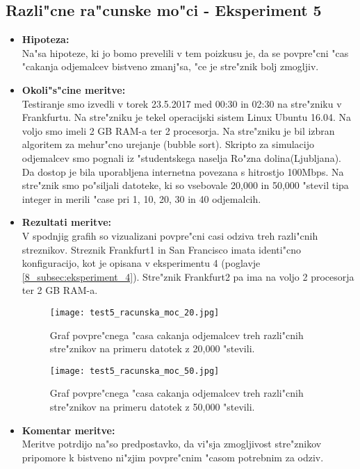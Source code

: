 \subsection{Razli"cne ra"cunske mo"ci - Eksperiment 5}
\begin{itemize}
	\item \textbf{Hipoteza: }  \\
		Na"sa hipoteze, ki jo bomo prevelili v tem poizkusu je, da se povpre"cni "cas "cakanja odjemalcev bistveno zmanj"sa, "ce je stre"znik bolj zmogljiv.
			
	\item \textbf{Okoli"s"cine meritve: } \\
		Testiranje smo izvedli v torek 23.5.2017 med 00:30 in 02:30 na stre"zniku v Frankfurtu. Na stre"zniku je tekel operacijski sistem Linux Ubuntu 16.04. Na voljo smo imeli 2 GB RAM-a ter 2 procesorja. Na stre"zniku je bil izbran algoritem za mehur"cno urejanje (bubble sort). Skripto za simulacijo odjemalcev smo pognali iz "studentskega naselja Ro"zna dolina(Ljubljana). Da dostop je bila uporabljena internetna povezana s hitrostjo 100Mbps. 
		Na stre"znik smo po"siljali datoteke, ki so vsebovale 20,000 in 50,000 "stevil tipa integer in merili "case pri 1, 10, 20, 30 in 40 odjemalcih.

 	\item \textbf{Rezultati meritve: }  \\
		V spodnjig grafih so vizualizani povpre"cni casi odziva treh razli"cnih streznikov. Streznik Frankfurt1 in San Francisco imata identi"cno konfiguracijo, kot je opisana v eksperimentu 4 (poglavje \ref{8_subsec:eksperiment_4}). Stre"znik Frankfurt2 pa ima na voljo 2 procesorja ter 2 GB RAM-a. 
		\begin{figure}[h]
  		\centering
  		  \texttt{[image: test5\_racunska\_moc\_20.jpg]}
  		\caption{Graf povpre"cnega "casa cakanja odjemalcev treh razli"cnih stre"znikov na primeru datotek z 20,000 "stevili.}
  		\label{8_graf_racunska_moc_20}
		\end{figure}

	\begin{figure}[h]
  		\centering
  		  \texttt{[image: test5\_racunska\_moc\_50.jpg]}
  		\caption{Graf povpre"cnega "casa cakanja odjemalcev treh razli"cnih stre"znikov na primeru datotek z 50,000 "stevili.}
  		\label{8_graf_racunska_moc_50}
		\end{figure}
	\pagebreak
	\item \textbf{Komentar meritve: } \\ 
		Meritve potrdijo na"so predpostavko, da vi"sja zmogljivost stre"znikov pripomore k bistveno ni"zjim povpre"cnim "casom potrebnim za odziv.



\end{itemize}




